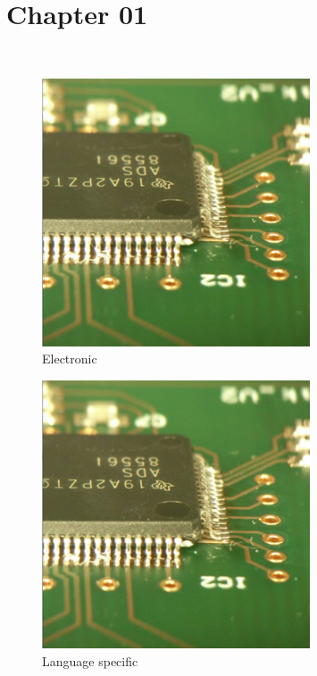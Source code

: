 \chapter{Chapter 01}
\blindtext~\cite{4767851}

\begin{figure}[h!]
    \begin{center}
        \includegraphics[width=0.2\linewidth]{../common/chapter_01/resources/Elektronik.jpg}
    \end{center}
    \caption{Electronic}
    \label{fig:Electronic}
\end{figure}

\begin{figure}[h!]
    \begin{center}
        \includegraphics[width=0.2\linewidth]{./chapter_01/resources/Language_specific_resource.jpg}
    \end{center}
    \caption{Language specific}
    \label{fig:Language specific}
\end{figure}